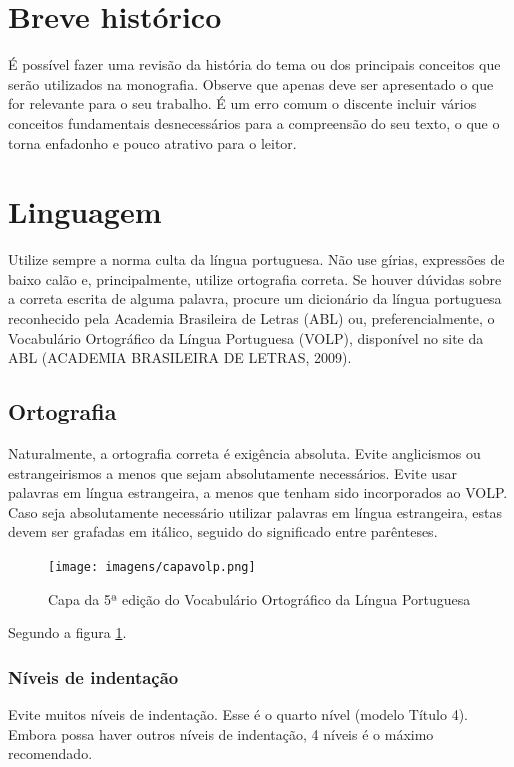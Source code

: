 \section{Breve histórico}
É possível fazer uma revisão da história do tema ou dos principais conceitos que serão utilizados na monografia. Observe que apenas deve ser apresentado o que for relevante para o seu trabalho. É um erro comum o discente incluir vários conceitos fundamentais desnecessários para a compreensão do seu texto, o que o torna enfadonho e pouco atrativo para o leitor.

\section{Linguagem}
Utilize sempre a norma culta da língua portuguesa. Não use gírias, expressões de baixo calão e, principalmente, utilize ortografia correta. Se houver dúvidas sobre a correta escrita de alguma palavra, procure um dicionário da língua portuguesa reconhecido pela Academia Brasileira de Letras (ABL) ou, preferencialmente, o Vocabulário Ortográfico da Língua Portuguesa (VOLP), disponível no site da ABL (ACADEMIA BRASILEIRA DE LETRAS, 2009).

\subsection{Ortografia}
Naturalmente, a ortografia correta é exigência absoluta. Evite anglicismos ou estrangeirismos a menos que sejam absolutamente necessários. Evite usar palavras em língua estrangeira, a menos que tenham sido incorporados ao VOLP. Caso seja absolutamente necessário utilizar palavras em língua estrangeira, estas devem ser grafadas em itálico, seguido do significado entre parênteses.


\begin{figure}[H]%
	\centering
 	  \caption{Capa da 5ª edição do Vocabulário Ortográfico da Língua Portuguesa}
		\texttt{[image: imagens/capavolp.png]}
	\label{fig:capavolp}
\end{figure}

Segundo a figura \ref{fig:capavolp}.
\subsubsection{Níveis de indentação}
Evite muitos níveis de indentação. Esse é o quarto nível (modelo Título 4). Embora possa haver outros níveis de indentação, 4 níveis é o máximo recomendado.
